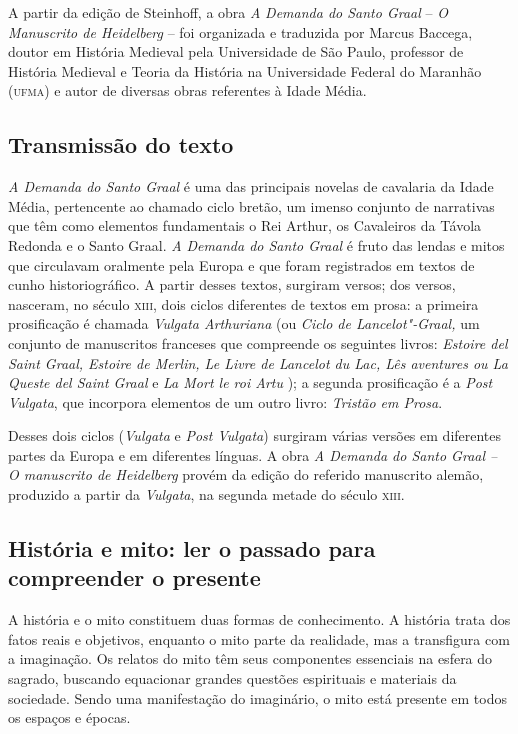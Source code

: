 \documentclass{extarticle}
\begin{document}
A partir da edição de Steinhoff, a obra \emph{A} \emph{Demanda do Santo
Graal} -- \emph{O Manuscrito de Heidelberg} -- foi organizada e
traduzida por Marcus Baccega, doutor em História Medieval pela
Universidade de São Paulo, professor de História Medieval e Teoria da
História na Universidade Federal do Maranhão (\textsc{ufma}) e autor de diversas
obras referentes à Idade Média.

\subsection{Transmissão do texto}

\emph{A Demanda do Santo Graal} é uma das
principais novelas de cavalaria da Idade Média, pertencente ao chamado
ciclo bretão, um imenso conjunto de narrativas que têm como elementos
fundamentais o Rei Arthur, os Cavaleiros da Távola Redonda e o Santo
Graal. \emph{A} \emph{Demanda do Santo Graal} é fruto das lendas e mitos
que circulavam oralmente pela Europa e que foram registrados em textos
de cunho historiográfico. A partir desses textos, surgiram versos; dos
versos, nasceram, no século \textsc{xiii}, dois ciclos diferentes de textos em
prosa: a primeira prosificação é chamada \emph{Vulgata Arthuriana} (ou
\emph{Ciclo de Lancelot"-Graal,} um conjunto de manuscritos franceses que
compreende os seguintes livros: \emph{Estoire del Saint Graal, Estoire
de Merlin, Le Livre de Lancelot du Lac, Lês aventures ou La Queste del
Saint Graal} e \emph{La Mort le roi Artu} ); a segunda prosificação é a
\emph{Post Vulgata}, que incorpora elementos de um outro livro:
\emph{Tristão em Prosa}.

Desses dois ciclos (\emph{Vulgata} e \emph{Post
Vulgata}) surgiram várias versões em diferentes partes da Europa e em
diferentes línguas. A obra \emph{A Demanda do Santo Graal -- O
manuscrito de Heidelberg} provém da edição do referido manuscrito
alemão, produzido a partir da \emph{Vulgata}, na segunda metade do
século \textsc{xiii}.


\subsection{História e mito: ler o passado para compreender o presente}

A história e o mito constituem duas formas de conhecimento. A
história trata dos fatos reais e objetivos, enquanto o mito parte da
realidade, mas a transfigura com a imaginação. Os relatos do mito têm
seus componentes essenciais na esfera do sagrado, buscando equacionar
grandes questões espirituais e materiais da sociedade. Sendo uma
manifestação do imaginário, o mito está presente em todos os espaços e
épocas.
\end{document}

